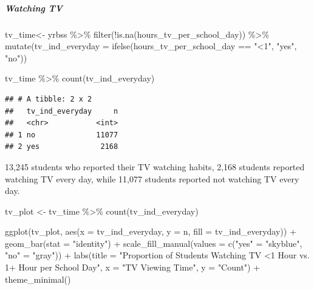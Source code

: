 \documentclass[
]{article}
\newenvironment{Shaded}{\begin{snugshade}}{\end{snugshade}}
\newcommand{\AttributeTok}[1]{\textcolor[rgb]{0.77,0.63,0.00}{#1}}
\newcommand{\FunctionTok}[1]{\textcolor[rgb]{0.00,0.00,0.00}{#1}}
\newcommand{\NormalTok}[1]{#1}
\newcommand{\OtherTok}[1]{\textcolor[rgb]{0.56,0.35,0.01}{#1}}
\newcommand{\SpecialCharTok}[1]{\textcolor[rgb]{0.00,0.00,0.00}{#1}}
\newcommand{\StringTok}[1]{\textcolor[rgb]{0.31,0.60,0.02}{#1}}
\begin{document}
\hypertarget{watching-tv}{%
\subparagraph{Watching TV}\label{watching-tv}}

\begin{Shaded}
\begin{Highlighting}[]
\NormalTok{tv\_time}\OtherTok{\textless{}{-}}\NormalTok{ yrbss }\SpecialCharTok{\%\textgreater{}\%}
  \FunctionTok{filter}\NormalTok{(}\SpecialCharTok{!}\FunctionTok{is.na}\NormalTok{(hours\_tv\_per\_school\_day)) }\SpecialCharTok{\%\textgreater{}\%}
  \FunctionTok{mutate}\NormalTok{(}\AttributeTok{tv\_ind\_everyday =} \FunctionTok{ifelse}\NormalTok{(hours\_tv\_per\_school\_day }\SpecialCharTok{==} \StringTok{"\textless{}1"}\NormalTok{, }\StringTok{"yes"}\NormalTok{, }\StringTok{"no"}\NormalTok{))}

\NormalTok{tv\_time }\SpecialCharTok{\%\textgreater{}\%}
  \FunctionTok{count}\NormalTok{(tv\_ind\_everyday)}
\end{Highlighting}
\end{Shaded}

\begin{verbatim}
## # A tibble: 2 x 2
##   tv_ind_everyday     n
##   <chr>           <int>
## 1 no              11077
## 2 yes              2168
\end{verbatim}

13,245 students who reported their TV watching habits, 2,168 students
reported watching TV every day, while 11,077 students reported not
watching TV every day.

\begin{Shaded}
\begin{Highlighting}[]
\NormalTok{tv\_plot }\OtherTok{\textless{}{-}}\NormalTok{ tv\_time }\SpecialCharTok{\%\textgreater{}\%}
  \FunctionTok{count}\NormalTok{(tv\_ind\_everyday)}

\FunctionTok{ggplot}\NormalTok{(tv\_plot, }\FunctionTok{aes}\NormalTok{(}\AttributeTok{x =}\NormalTok{ tv\_ind\_everyday, }\AttributeTok{y =}\NormalTok{ n, }\AttributeTok{fill =}\NormalTok{ tv\_ind\_everyday)) }\SpecialCharTok{+}
  \FunctionTok{geom\_bar}\NormalTok{(}\AttributeTok{stat =} \StringTok{"identity"}\NormalTok{) }\SpecialCharTok{+}
  \FunctionTok{scale\_fill\_manual}\NormalTok{(}\AttributeTok{values =} \FunctionTok{c}\NormalTok{(}\StringTok{"yes"} \OtherTok{=} \StringTok{"skyblue"}\NormalTok{, }\StringTok{"no"} \OtherTok{=} \StringTok{"gray"}\NormalTok{)) }\SpecialCharTok{+}
  \FunctionTok{labs}\NormalTok{(}\AttributeTok{title =} \StringTok{"Proportion of Students Watching TV \textless{}1 Hour vs. 1+ Hour per School Day"}\NormalTok{,}
       \AttributeTok{x =} \StringTok{"TV Viewing Time"}\NormalTok{,}
       \AttributeTok{y =} \StringTok{"Count"}\NormalTok{) }\SpecialCharTok{+}
  \FunctionTok{theme\_minimal}\NormalTok{()}
\end{Highlighting}
\end{Shaded}
\end{document}
